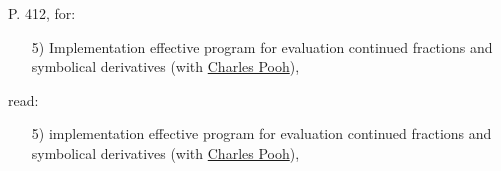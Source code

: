 \bigskip



\noindent

P. 412, for:



\itemsep=0mm  

\parsep=0mm 

 \begin{itemize}

\itemsep=0mm  

\parsep=0mm 

\item[5)]   Implementation effective program for evaluation continued fractions and symbolical derivatives (with \href{http://www.math.buffalo.edu/mad/PEEPS2/pooh_charles.html}{Charles Pooh}),



\end{itemize}



read:





\itemsep=0mm  

\parsep=0mm 

 \begin{itemize}

\itemsep=0mm  

\parsep=0mm 

\item[5)]   implementation effective program for evaluation continued fractions and symbolical derivatives (with \href{http://www.math.buffalo.edu/mad/PEEPS2/pooh_charles.html}{Charles Pooh}),



\end{itemize}





\Russian



\newpage





